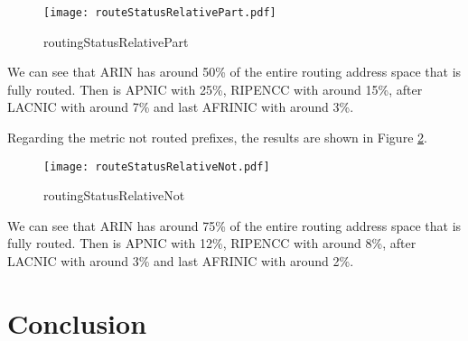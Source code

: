 \documentclass[11pt,a4paper]{scrreprt}
\begin{document}
\begin{figure}[ht!]
\centering
\texttt{[image: routeStatusRelativePart.pdf]}
\caption{routingStatusRelativePart}
\label{fig:routingStatusRelativePart}
\end{figure}

We can see that ARIN has around 50\% of the entire routing address space that is fully routed. Then is APNIC with 25\%, RIPENCC with around 15\%, after LACNIC with around 7\% and last AFRINIC  with around 3\%. 
\clearpage

Regarding the metric not routed prefixes, the results are shown in Figure \ref{fig:routingStatusRelativeNot}. 

\begin{figure}[ht!]
\centering
\texttt{[image: routeStatusRelativeNot.pdf]}
\caption{routingStatusRelativeNot}
\label{fig:routingStatusRelativeNot}
\end{figure}

We can see that ARIN has around 75\% of the entire routing address space that is fully routed. Then is APNIC with 12\%, RIPENCC with around 8\%, after LACNIC with around 3\% and last AFRINIC  with around 2\%.

\chapter{Conclusion}
\end{document}
